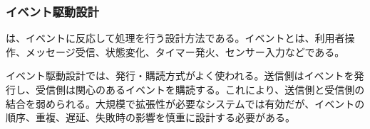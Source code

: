 \subsubsection{イベント駆動設計}

 は、イベントに反応して処理を行う設計方法である。イベントとは、利用者操作、メッセージ受信、状態変化、タイマー発火、センサー入力などである。

イベント駆動設計では、発行・購読方式がよく使われる。送信側はイベントを発行し、受信側は関心のあるイベントを購読する。これにより、送信側と受信側の結合を弱められる。大規模で拡張性が必要なシステムでは有効だが、イベントの順序、重複、遅延、失敗時の影響を慎重に設計する必要がある。

